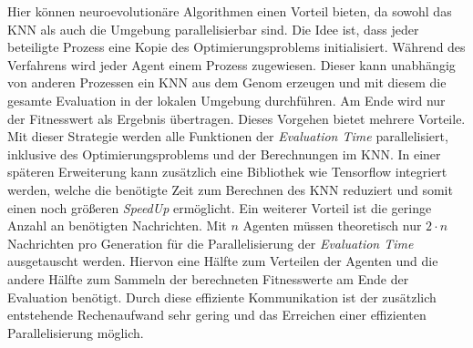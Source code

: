 Hier können neuroevolutionäre Algorithmen einen Vorteil bieten, da sowohl das \ac{KNN} als auch die Umgebung parallelisierbar sind. Die Idee ist, dass jeder beteiligte Prozess eine Kopie des Optimierungsproblems initialisiert. Während des Verfahrens wird jeder Agent einem Prozess zugewiesen. Dieser kann unabhängig von anderen Prozessen ein \ac{KNN} aus dem Genom erzeugen und mit diesem die gesamte Evaluation in der lokalen Umgebung durchführen. Am Ende wird nur der Fitnesswert als Ergebnis übertragen. Dieses Vorgehen bietet mehrere Vorteile. Mit dieser Strategie werden alle Funktionen der \emph{Evaluation Time} parallelisiert, inklusive des Optimierungsproblems und der Berechnungen im \ac{KNN}. In einer späteren Erweiterung kann zusätzlich eine Bibliothek wie Tensorflow integriert werden, welche die benötigte Zeit zum Berechnen des \ac{KNN} reduziert und somit einen noch größeren \emph{SpeedUp} ermöglicht. Ein weiterer Vorteil ist die geringe Anzahl an benötigten Nachrichten. Mit $n$ Agenten müssen theoretisch nur $2 \cdot n$ Nachrichten pro Generation für die Parallelisierung der \emph{Evaluation Time} ausgetauscht werden. Hiervon eine Hälfte zum Verteilen der Agenten und die andere Hälfte zum Sammeln der berechneten Fitnesswerte am Ende der Evaluation benötigt. Durch diese effiziente Kommunikation ist der zusätzlich entstehende Rechenaufwand sehr gering und das Erreichen einer effizienten Parallelisierung möglich.

 



